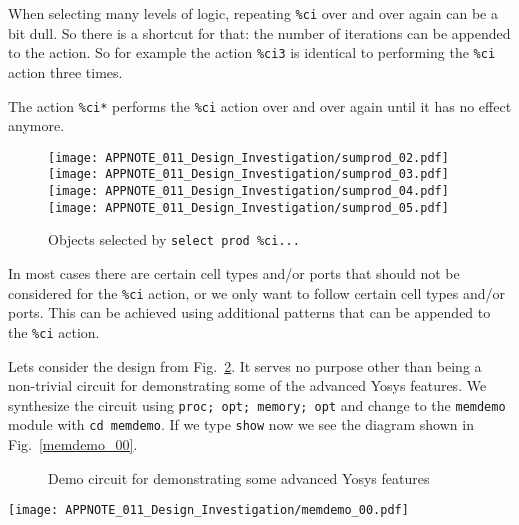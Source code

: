\documentclass[9pt,technote,a4paper]{IEEEtran}
\begin{document}
When selecting many levels of logic, repeating {\tt \%ci} over and over again
can be a bit dull. So there is a shortcut for that: the number of iterations
can be appended to the action. So for example the action {\tt \%ci3} is
identical to performing the {\tt \%ci} action three times.

The action {\tt \%ci*} performs the {\tt \%ci} action over and over again until
it has no effect anymore.

\begin{figure}[t]
\hfill \texttt{[image: APPNOTE\_011\_Design\_Investigation/sumprod\_02.pdf]} \\
\texttt{[image: APPNOTE\_011\_Design\_Investigation/sumprod\_03.pdf]} \\
\texttt{[image: APPNOTE\_011\_Design\_Investigation/sumprod\_04.pdf]} \\
\texttt{[image: APPNOTE\_011\_Design\_Investigation/sumprod\_05.pdf]} \\
\caption{Objects selected by {\tt select prod \%ci...}}
\label{select_prod}
\end{figure}

\medskip

In most cases there are certain cell types and/or ports that should not be considered for the {\tt \%ci}
action, or we only want to follow certain cell types and/or ports. This can be achieved using additional
patterns that can be appended to the {\tt \%ci} action.

Lets consider the design from Fig.~\ref{memdemo_src}. It serves no purpose other than being a non-trivial
circuit for demonstrating some of the advanced Yosys features. We synthesize the circuit using {\tt proc;
opt; memory; opt} and change to the {\tt memdemo} module with {\tt cd memdemo}. If we type {\tt show}
now we see the diagram shown in Fig.~\ref{memdemo_00}.

\begin{figure}[b!]

\caption{Demo circuit for demonstrating some advanced Yosys features}
\label{memdemo_src}
\end{figure}

\begin{figure*}[t]
\texttt{[image: APPNOTE\_011\_Design\_Investigation/memdemo\_00.pdf]} \\
\caption{Complete circuit diagram for the design shown in Fig.~\ref{memdemo_src}}
\label{memdemo_00}
\end{figure*}
\end{document}
